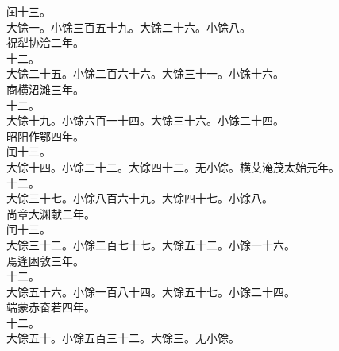 \documentclass{zhvt-classic}
\begin{document}
\hspace*{2em}闰十三。\\
\hspace*{2em}大馀一。小馀三百五十九。大馀二十六。小馀八。\\
\hspace*{2em}祝犁协洽二年。\\
\hspace*{2em}十二。\\
\hspace*{2em}大馀二十五。小馀二百六十六。大馀三十一。小馀十六。\\
\hspace*{2em}商横涒滩三年。\\
\hspace*{2em}十二。\\
\hspace*{2em}大馀十九。小馀六百一十四。大馀三十六。小馀二十四。\\
\hspace*{2em}昭阳作鄂四年。\\
\hspace*{2em}闰十三。\\
\hspace*{2em}大馀十四。小馀二十二。大馀四十二。无小馀。横艾淹茂太始元年。\\
\hspace*{2em}十二。\\
\hspace*{2em}大馀三十七。小馀八百六十九。大馀四十七。小馀八。\\
\hspace*{2em}尚章大渊献二年。\\
\hspace*{2em}闰十三。\\
\hspace*{2em}大馀三十二。小馀二百七十七。大馀五十二。小馀一十六。\\
\hspace*{2em}焉逢困敦三年。\\
\hspace*{2em}十二。\\
\hspace*{2em}大馀五十六。小馀一百八十四。大馀五十七。小馀二十四。\\
\hspace*{2em}端蒙赤奋若四年。\\
\hspace*{2em}十二。\\
\hspace*{2em}大馀五十。小馀五百三十二。大馀三。无小馀。\\
\end{document}
